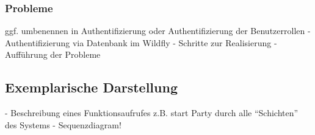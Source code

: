 \subsubsection{Probleme}

ggf. umbenennen in Authentifizierung oder Authentifizierung der Benutzerrollen
- Authentifizierung via Datenbank im Wildfly
- Schritte zur Realisierung
- Aufführung der Probleme


\subsection{Exemplarische Darstellung}
- Beschreibung eines Funktionsaufrufes z.B. start Party durch alle "`Schichten"' des Systems
- Sequenzdiagram!



